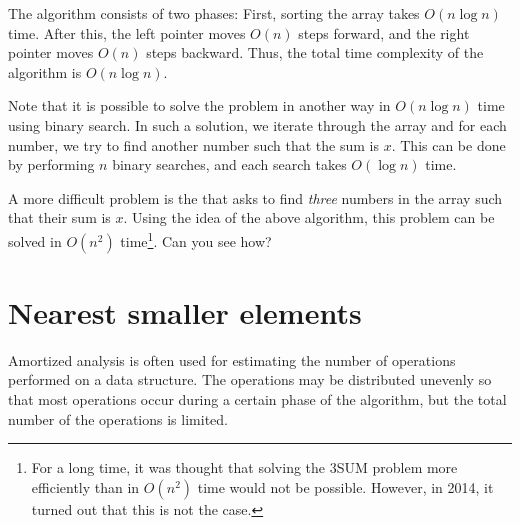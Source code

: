 \begin{center}
\end{center}

The algorithm consists of two phases:
First, sorting the array takes $O(n \log n)$ time.
After this, the left pointer moves $O(n)$ steps
forward, and the right pointer moves $O(n)$ steps
backward. Thus, the total time complexity
of the algorithm is $O(n \log n)$.

Note that it is possible to solve the problem
in another way in $O(n \log n)$ time using binary search.
In such a solution, we iterate through the array
and for each number, we try to find another
number such that the sum is $x$.
This can be done by performing $n$ binary searches,
and each search takes $O(\log n)$ time.

A more difficult problem is 
the  that asks to
find \emph{three} numbers in the array
such that their sum is $x$.
Using the idea of the above algorithm,
this problem can be solved in $O(n^2)$ time\footnote{For a long time,
it was thought that solving
the 3SUM problem more efficiently than in $O(n^2)$ time
would not be possible.
However, in 2014, it turned out \cite{gro14}
that this is not the case.}.
Can you see how?

\section{Nearest smaller elements}


Amortized analysis is often used for
estimating the number of operations
performed on a data structure.
The operations may be distributed unevenly so
that most operations occur during a
certain phase of the algorithm, but the total
number of the operations is limited.


